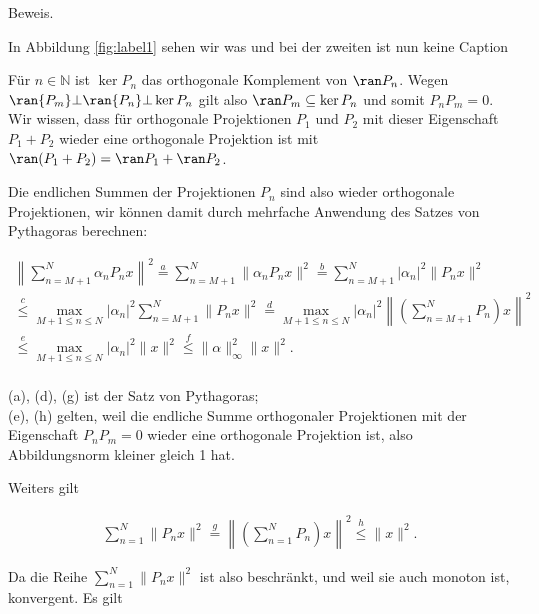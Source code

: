\begin{solution}
Beweis.


In Abbildung \ref{fig:label1} sehen wir was und bei der zweiten ist nun keine
Caption

\newpage
Für $n \in \mathbb{N}$ ist $\ker{P_n}$ das orthogonale Komplement von $\ran P_n$.
Wegen $\ran{P_m} \bot \ran{P_n} \bot \ker{P_n}$ gilt also $\ran P_m \subseteq \ker P_n$ und somit $P_n P_m = 0$.
 Wir wissen, dass für orthogonale Projektionen $P_1$ und $P_2$ mit dieser Eigenschaft $P_1 + P_2$ wieder eine orthogonale Projektion ist mit $\ran(P_1 + P_2) = \ran P_1 + \ran P_2$.

Die endlichen Summen der Projektionen $P_n$ sind also wieder orthogonale Projektionen, wir können damit durch mehrfache Anwendung des Satzes von Pythagoras berechnen:

\begin{align}
    \left\| \sum_{n = M+1}^N \alpha_n P_n x \right\|^2 \stackrel{a}{=} \sum_{n = M+1}^N \| \alpha_n P_n x \|^2 \stackrel{b}{=} \sum_{n = M+1}^N | \alpha_n|^2 \| P_n x \|^2 \\
    \stackrel{c}{\leq} \max_{M+1 \leq n \leq N} |\alpha_n|^2 \sum_{n = M+1}^N \| P_n x \|^2 \stackrel{d}{=}
    \max_{M+1 \leq n \leq N} |\alpha_n|^2 \left\| \left(\sum_{n = M+1}^N P_n\right) x \right\|^2 \\ \stackrel{e}{\leq}
    \max_{M+1 \leq n \leq N} |\alpha_n|^2 \|x\|^2
    \stackrel{f}{\leq} \| \alpha \|_{\infty}^2 \| x \|^2.
\end{align}
\\
(a), (d), (g) ist der Satz von Pythagoras; \\
(e), (h) gelten, weil die endliche Summe orthogonaler Projektionen mit der Eigenschaft $P_n P_m = 0$ wieder eine orthogonale Projektion ist, also Abbildungsnorm kleiner gleich 1 hat.

Weiters gilt

\begin{align}
    \sum_{n = 1}^N \| P_n x \|^2 \stackrel{g}{=}
     \left\| \left(\sum_{n = 1}^N P_n\right) x \right\|^2 \stackrel{h}{\leq} \|x\|^2.
\end{align}

Da die Reihe $\sum_{n = 1}^N \| P_n x \|^2$ ist also beschränkt, und weil sie auch monoton ist, konvergent. Es gilt


\end{solution}
